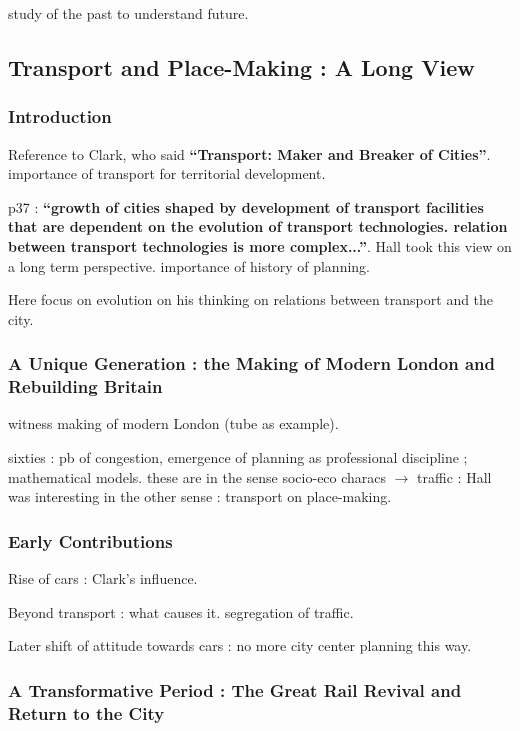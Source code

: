 study of the past to understand future.


\subsection{Transport and Place-Making : A Long View}

\subsubsection{Introduction}

Reference to Clark, who said \textbf{``Transport: Maker and Breaker of Cities''}. importance of transport for territorial development.

p37 : \textbf{``growth of cities shaped by development of transport facilities that are dependent on the evolution of transport technologies. relation between transport technologies is more complex...''}. Hall took this view on a long term perspective. importance of history of planning. 

Here focus on evolution on his thinking on relations between transport and the city.

\subsubsection{A Unique Generation : the Making of Modern London and Rebuilding Britain}

witness making of modern London (tube as example).

sixties : pb of congestion, emergence of planning as professional discipline ; mathematical models. these are in the sense socio-eco characs $\rightarrow$ traffic : Hall was interesting in the other sense : transport on place-making.

\subsubsection{Early Contributions}

Rise of cars : Clark's influence. 

Beyond transport : what causes it. segregation of traffic.

Later shift of attitude towards cars : no more city center planning this way.

\subsubsection{A Transformative Period : The Great Rail Revival and Return to the City}

